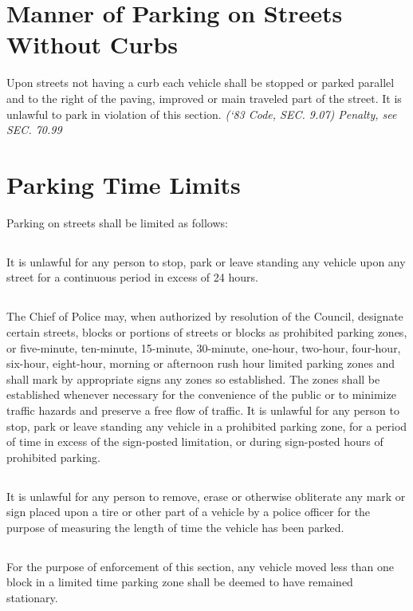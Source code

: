 \section{Manner of Parking on Streets Without Curbs}
Upon streets not having a curb each vehicle shall be stopped or parked parallel and to the right of the paving, improved or main traveled part of the street.  It is unlawful to park in violation of this section.\newline
\emph{(‘83 Code, SEC. 9.07)  Penalty, see SEC. 70.99}

\section{Parking Time Limits}
Parking on streets shall be limited as follows:
\subsection{}
It is unlawful for any person to stop, park or leave standing any vehicle upon any street for a continuous period in excess of 24 hours.
\subsection{}
The Chief of Police may, when authorized by resolution of the Council, designate certain streets, blocks or portions of streets or blocks as prohibited parking zones, or five-minute, ten-minute, 15-minute, 30-minute, one-hour, two-hour, four-hour, six-hour, eight-hour, morning or afternoon rush hour limited parking zones and shall mark by appropriate signs any zones so established.  The zones shall be established whenever necessary for the convenience of the public or to minimize traffic hazards and preserve a free flow of traffic.  It is unlawful for any person to stop, park or leave standing any vehicle in a prohibited parking zone, for a period of time in excess of the sign-posted limitation, or during sign-posted hours of prohibited parking.
\subsection{}
It is unlawful for any person to remove, erase or otherwise obliterate any mark or sign placed upon a tire or other part of a vehicle by a police officer for the purpose of measuring the length of time the vehicle has been parked.
\subsection{}
For the purpose of enforcement of this section, any vehicle moved less than one block in a limited time parking zone shall be deemed to have remained stationary.
